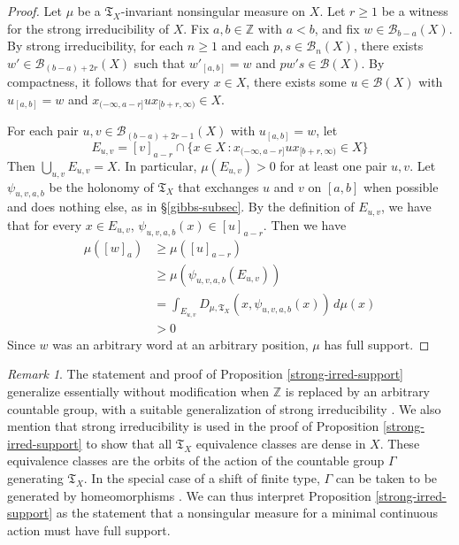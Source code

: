 \documentclass{amsproc}
\numberwithin{theorem}{section}
\theoremstyle{remark}
\newtheorem*{remark}{Remark}
\theoremstyle{definition}
\newcommand{\cB}{\mathcal{B}}
\newcommand{\fT}{\mathfrak{T}}
\newcommand{\Z}{\mathbb{Z}}
\theoremstyle{plain}
\begin{document}
\begin{proof}
Let $\mu$ be a $\fT_X$-invariant nonsingular measure on $X$. Let $r \geq 1$ be a witness for the strong irreducibility of $X$. Fix $a, b \in \Z$ with $a < b$, and fix $w \in \cB_{b-a}(X)$. By strong irreducibility, for each $n \geq 1$ and each $p, s \in \cB_{n}(X)$, there exists $w' \in \cB_{(b-a)+2r} (X)$ such that $w'_{[a,b]} = w$ and $p w' s \in \cB(X)$.
By compactness, it follows that for every $x \in X$, there exists some $u \in \cB(X)$ with $u_{[a,b]} = w$ and $x_{(-\infty, a-r]} u x_{[b+r, \infty)} \in X$. 


For each pair $u,v \in \cB_{(b-a)+2r-1}(X)$ with $u_{[a,b]} = w$, let 
\[
E_{u,v} = [v]_{a-r} \cap \{ x \in X \, : x_{(-\infty, a-r]} u x_{[b+r, \infty)} \in X  \}
\]
Then $\bigcup_{u,v} E_{u, v} = X$. In particular, $\mu(E_{u,v}) > 0$ for at least one pair $u,v$. Let $\psi_{u,v,a,b}$ be the holonomy of $\fT_X$ that exchanges $u$ and $v$ on $[a,b]$ when possible and does nothing else, as in \S \ref{gibbs-subsec}. By the definition of $E_{u,v}$, we have that for every $x \in E_{u,v}$, $\psi_{u,v,a,b}(x) \in [u]_{a-r}$. Then we have
%
\begin{align*}
    \mu([w]_a) &\geq \mu([u]_{a-r}) \\
    &\geq \mu(\psi_{u,v,a,b}(E_{u,v})) \\
    &= \int_{E_{u,v}} D_{\mu, \fT_X}(x, \psi_{u,v,a,b}(x)) \, d\mu(x)  \\
    &> 0
\end{align*}
%
Since $w$ was an arbitrary word at an arbitrary position, $\mu$ has full support.
\end{proof}

\begin{remark}
The statement and proof of Proposition \ref{strong-irred-support} generalize essentially without modification when $\Z$ is replaced by an arbitrary countable group, with a suitable generalization of strong irreducibility \cite{ceccherini-silberstein-coornaert-2012-periodic, barbieri2018equivalence}. We also mention that strong irreducibility is used in the proof of Proposition \ref{strong-irred-support} to show that all $\fT_X$ equivalence classes are dense in $X$. These equivalence classes are the orbits of the action of the countable group $\Gamma$ generating $\fT_X$. In the special case of a shift of finite type, $\Gamma$ can be taken to be generated by homeomorphisms \cite{meyerovitch2013gibbs}. We can thus interpret Proposition \ref{strong-irred-support} as the statement that a nonsingular measure for a minimal continuous action must have full support.
\end{remark}
\end{document}
